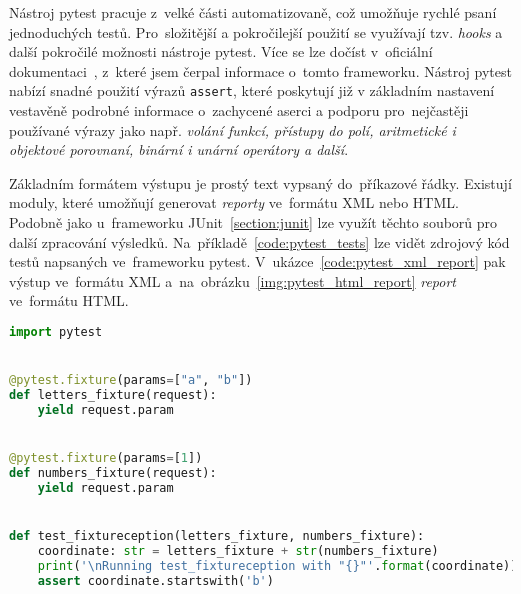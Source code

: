 Nástroj pytest pracuje z~velké části automatizovaně, což umožňuje rychlé psaní jednoduchých testů. Pro~složitější a pokročilejší použití se využívají tzv. \textit{hooks} a další pokročilé možnosti nástroje pytest. Více se lze dočíst v~oficiální dokumentaci~\cite{PytestDocumentation}, z~které jsem čerpal informace o~tomto frameworku.
Nástroj pytest nabízí snadné použití výrazů \verb|assert|, které poskytují již v základním nastavení vestavěně podrobné informace o~zachycené aserci a podporu pro~nejčastěji používané výrazy jako např. \textit{volání funkcí, přístupy do polí, aritmetické i objektové porovnaní, binární i unární operátory a další}.

Základním formátem výstupu je prostý text vypsaný do~příkazové řádky. Existují moduly, které umožňují generovat \textit{reporty} ve~formátu XML nebo HTML. Podobně jako u~frameworku JUnit~\ref{section:junit} lze využít těchto souborů pro další zpracování výsledků. Na~příkladě~\ref{code:pytest_tests} lze vidět zdrojový kód testů napsaných ve~frameworku pytest. V~ukázce~\ref{code:pytest_xml_report} pak výstup ve~formátu XML a~na~obrázku~\ref{img:pytest_html_report} \textit{report} ve~formátu HTML.
\begin{lstlisting}[language=Python, basicstyle=\footnotesize\ttfamily, keepspaces=true, label={code:pytest_tests}, caption=Příklad využití frameworku pytest k~testování. Využití tzv.~\textit{fixtures} k~pokročilé parametrizaci testů. Zjednodušeno z~původní verze~\cite{PytestExmapleRepository}.]
import pytest


@pytest.fixture(params=["a", "b"])
def letters_fixture(request):
    yield request.param


@pytest.fixture(params=[1])
def numbers_fixture(request):
    yield request.param


def test_fixtureception(letters_fixture, numbers_fixture):
    coordinate: str = letters_fixture + str(numbers_fixture)
    print('\nRunning test_fixtureception with "{}"'.format(coordinate))
    assert coordinate.startswith('b')
\end{lstlisting}
\vfill

